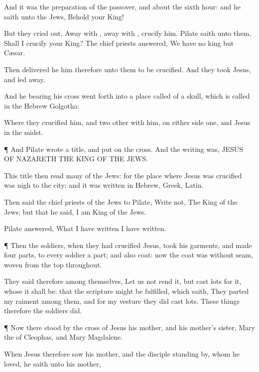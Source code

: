 {And it
was the
preparation of the
passover,
and
about the
sixth
hour:
and he
saith unto the
Jews,
Behold
your
King!

But they cried
out, Away
with
{}, away
with
{},
crucify
him.
Pilate
saith unto
them, Shall I
crucify
your
King? The chief
priests
answered, We
have
no
king
but
Cæsar.

Then delivered
he
him
therefore unto
them
to be
crucified.
And they
took
Jesus,
and
led
{}
away.

And he
bearing
his
cross went
forth
into a
place
called
{} of a
skull,
which is
called in the
Hebrew
Golgotha:

Where they
crucified
him,
and
two
other
with
him, on
either side
one,
and
Jesus in the
midst.


\par }{\PP {}¶
And
Pilate
wrote a
title,
and
put
{}
on the
cross.
And the
writing
was,
JESUS OF
NAZARETH THE
KING OF THE
JEWS.

This
title
then
read
many of the
Jews:
for the
place
where
Jesus
was crucified
was
nigh to the
city:
and it
was
written in
Hebrew,
{}
Greek,
{}
Latin.

Then
said the chief
priests of the
Jews to
Pilate,
Write
not, The
King of the
Jews;
but
that
he
said, I
am
King of the
Jews.

Pilate
answered,
What I have
written I have
written.


\par }{\PP {}¶
Then the
soldiers,
when they had
crucified
Jesus,
took
his
garments,
and
made
four
parts, to
every
soldier a
part; and
also
{}
coat:
now the
coat
was without
seam,
woven
from the
top
throughout.

They
said
therefore
among
themselves, Let
us
not
rend
it,
but cast
lots
for
it,
whose it shall
be:
that the
scripture might be
fulfilled, which
saith, They
parted
my
raiment among
them,
and
for
my
vesture they did
cast
lots. These
things
therefore the
soldiers
did.


\par }{\PP {}¶
Now there
stood
by the
cross of
Jesus
his
mother,
and
his
mother’s
sister,
Mary the
{} of
Cleophas,
and
Mary
Magdalene.

When
Jesus
therefore
saw his
mother,
and the
disciple standing
by,
whom he
loved, he
saith unto
his
mother,
{}

}
